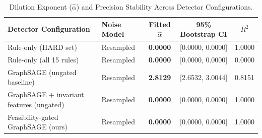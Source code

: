 \begin{table}[t]
\centering
\caption{Dilution Exponent ($\hat{\alpha}$) and Precision Stability Across Detector Configurations.}
\label{tab:ablation_dilution}
\begin{tabular}{llccc}
\toprule
\textbf{Detector Configuration} & \textbf{Noise Model} & \textbf{Fitted $\hat{\alpha}$} & \textbf{95\% Bootstrap CI} & \textbf{$R^2$} \\
\midrule
Rule-only (HARD set) & Resampled & \textbf{0.0000} & [0.0000, 0.0000] & 1.0000 \\
Rule-only (all 15 rules) & Resampled & \textbf{0.0000} & [0.0000, 0.0000] & 0.0000 \\
GraphSAGE (ungated baseline) & Resampled & \textbf{2.8129} & [2.6532, 3.0044] & 0.8151 \\
GraphSAGE + invariant features (ungated) & Resampled & \textbf{0.0000} & [0.0000, 0.0000] & 1.0000 \\
Feasibility-gated GraphSAGE (ours) & Resampled & \textbf{0.0000} & [0.0000, 0.0000] & 1.0000 \\
\bottomrule
\end{tabular}
\end{table}

